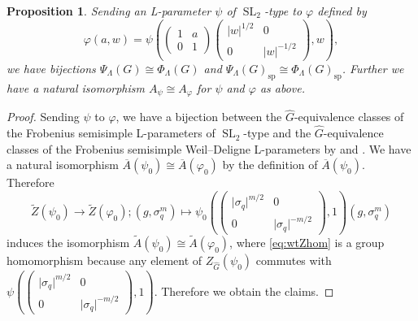 \documentclass[12pt,a4paper]{article}
\newtheorem{prop}[thm]{Proposition}
\DeclareMathOperator{\SL}{SL}
\newcommand{\mr}{\mathrm}
\newcommand{\ol}{\overline}
\newcommand{\wh}{\widehat}
\begin{document}
\begin{prop}\label{prop:bijSLWD}
Sending an L-parameter 
$\psi$ of $\SL_2$-type to $\varphi$ defined by 
\begin{equation}
 \varphi (a,w)=\psi \left( 
\begin{pmatrix}
1 & a \\ 0 & 1 
\end{pmatrix}
\begin{pmatrix}
\lvert w \rvert^{1/2} & 0 \\ 0 & \lvert w \rvert^{-1/2} 
\end{pmatrix}, w \right) , 
\end{equation}
we have bijections 
$\Psi_{\Lambda}(G) \cong \Phi_{\Lambda}(G)$ 
and 
$\Psi_{\Lambda}(G)_{\mr{sp}} \cong \Phi_{\Lambda}(G)_{\mr{sp}}$. 
Further we have a natural isomorphism 
$A_{\psi} \cong A_{\varphi}$ for $\psi$ and $\varphi$ as above. 
\end{prop}
\begin{proof}
Sending $\psi$ to $\varphi$, 
we have a bijection between 
the $\wh{G}$-equivalence classes of 
the Frobenius semisimple L-parameters 
of $\SL_2$-type 
and 
the $\wh{G}$-equivalence classes of 
the Frobenius semisimple Weil--Deligne L-parameters 
by \cite[Theorem 6.16]{BMIYJMmor} and \cite[Proposition 1.7]{ImaLLCell}. 
We have a natural isomorphism 
$\ol{A} (\psi_0) \cong \ol{A} (\varphi_0)$ by the definition of $\ol{A} (\psi_0)$. 
Therefore 
\begin{equation}\label{eq:wtZhom}
\widetilde{Z}(\psi_0) \to 
\widetilde{Z}(\varphi_0) ; (g,\sigma_q^m) \mapsto 
\psi_0 \left( 
\begin{pmatrix}
	\lvert \sigma_q \rvert^{m/2} & 0 \\ 0 & \lvert \sigma_q \rvert^{-m/2} 
\end{pmatrix}, 1 \right)(g,\sigma_q^m)
\end{equation}
induces the isomorphism 
$\widetilde{A} (\psi_0) \cong \widetilde{A} (\varphi_0)$, 
where \eqref{eq:wtZhom} is a group homomorphism because any element of $Z_{\wh{G}}(\psi_0)$ commutes with $\psi \left( 
\begin{pmatrix}
	\lvert \sigma_q \rvert^{m/2} & 0 \\ 0 & \lvert \sigma_q \rvert^{-m/2} 
\end{pmatrix}, 1 \right)$. 
Therefore we obtain the claims. 
\end{proof}
\end{document}
